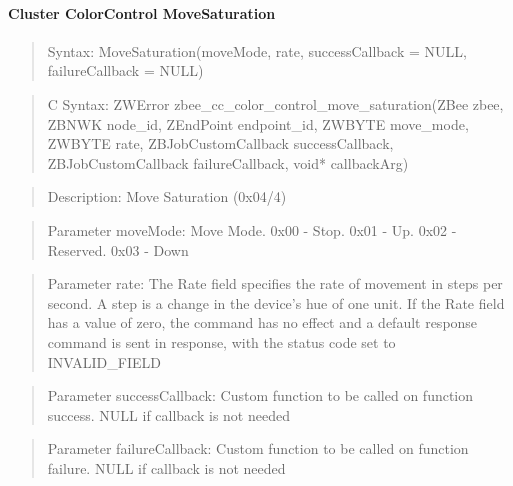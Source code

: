 \paragraph{Cluster ColorControl MoveSaturation}
\begin{quote}Syntax: MoveSaturation(moveMode, rate, successCallback = NULL, failureCallback = NULL)\end{quote}
\begin{quote}C Syntax: ZWError zbee\_cc\_color\_control\_move\_saturation(ZBee zbee, ZBNWK node\_id, ZEndPoint endpoint\_id, ZWBYTE move\_mode, ZWBYTE rate, ZBJobCustomCallback successCallback, ZBJobCustomCallback failureCallback, void* callbackArg)\end{quote}
\begin{quote}Description: Move Saturation (0x04/4)\end{quote}
\begin{quote}Parameter moveMode: Move Mode. 0x00 - Stop. 0x01 - Up. 0x02 - Reserved. 0x03 - Down\end{quote}
\begin{quote}Parameter rate: The Rate field specifies the rate of movement in steps per second. A step is a change in the device’s hue of one unit. If the Rate field has a value of zero, the command has no effect and a default response command is sent in response, with the status code set to INVALID\_FIELD\end{quote}
\begin{quote}Parameter successCallback: Custom function to be called on function success. NULL if callback is not needed\end{quote}
\begin{quote}Parameter failureCallback: Custom function to be called on function failure. NULL if callback is not needed\end{quote}


